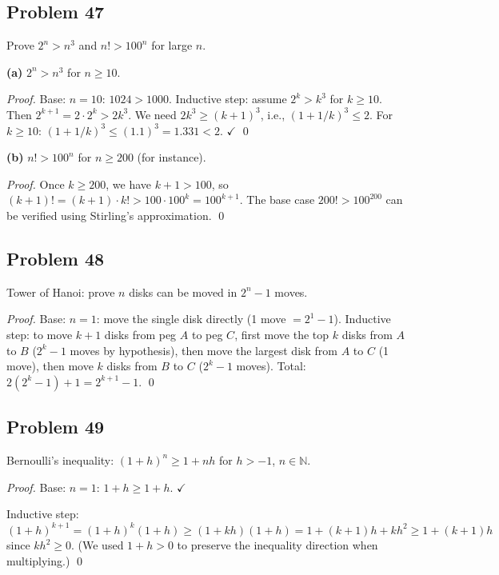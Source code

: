 \subsection*{Problem 47}
Prove $2^n > n^3$ and $n! > 100^n$ for large $n$.

\textbf{(a)} $2^n > n^3$ for $n \ge 10$.

\textit{Proof.} Base: $n=10$: $1024 > 1000$. Inductive step: assume $2^k > k^3$ for $k \ge 10$. Then $2^{k+1} = 2 \cdot 2^k > 2k^3$. We need $2k^3 \ge (k+1)^3$, i.e., $(1+1/k)^3 \le 2$. For $k \ge 10$: $(1+1/k)^3 \le (1.1)^3 = 1.331 < 2$. $\checkmark$ \qed

\textbf{(b)} $n! > 100^n$ for $n \ge 200$ (for instance).

\textit{Proof.} Once $k \ge 200$, we have $k + 1 > 100$, so $(k+1)! = (k+1) \cdot k! > 100 \cdot 100^k = 100^{k+1}$. The base case $200! > 100^{200}$ can be verified using Stirling's approximation. \qed

\subsection*{Problem 48}
Tower of Hanoi: prove $n$ disks can be moved in $2^n - 1$ moves.

\textit{Proof.} Base: $n=1$: move the single disk directly (1 move $= 2^1 - 1$).
Inductive step: to move $k+1$ disks from peg $A$ to peg $C$, first move the top $k$ disks from $A$ to $B$ ($2^k - 1$ moves by hypothesis), then move the largest disk from $A$ to $C$ (1 move), then move $k$ disks from $B$ to $C$ ($2^k - 1$ moves). Total: $2(2^k-1)+1 = 2^{k+1}-1$. \qed

\subsection*{Problem 49}
Bernoulli's inequality: $(1+h)^n \ge 1 + nh$ for $h > -1$, $n \in \mathbb{N}$.

\textit{Proof.} Base: $n=1$: $1+h \ge 1+h$. $\checkmark$

Inductive step: $(1+h)^{k+1} = (1+h)^k(1+h) \ge (1+kh)(1+h) = 1 + (k+1)h + kh^2 \ge 1 + (k+1)h$
since $kh^2 \ge 0$. (We used $1+h > 0$ to preserve the inequality direction when multiplying.) \qed

